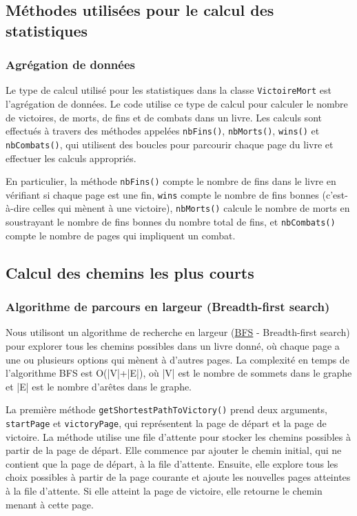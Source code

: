 \documentclass[a4paper,12pt]{article}
\begin{document}
\subsection{Méthodes utilisées pour le calcul des statistiques}
\subsubsection{Agrégation de données}
Le type de calcul utilisé pour les statistiques dans la classe \verb|VictoireMort| est l'agrégation de données.
Le code utilise ce type de calcul pour calculer le nombre de victoires, de morts, de fins et de combats dans un livre. Les calculs sont effectués à travers des méthodes appelées \verb|nbFins()|, \verb|nbMorts()|, \verb|wins()| et \verb|nbCombats()|, qui utilisent des boucles pour parcourir chaque page du livre et effectuer les calculs appropriés.

En particulier, la méthode \verb|nbFins()| compte le nombre de fins dans le livre en vérifiant si chaque page est une fin, \verb|wins| compte le nombre de fins bonnes (c'est-à-dire celles qui mènent à une victoire), \verb|nbMorts()| calcule le nombre de morts en soustrayant le nombre de fins bonnes du nombre total de fins, et \verb|nbCombats()| compte le nombre de pages qui impliquent un combat.
\subsection{Calcul des chemins les plus courts}
\subsubsection{Algorithme de parcours en largeur (Breadth-first search)}
Nous utilisont un algorithme de recherche en largeur (\href{https://en.wikipedia.org/wiki/Breadth-first_search}{BFS} - Breadth-first search) pour explorer tous les chemins possibles dans un livre donné, où chaque page a une ou plusieurs options qui mènent à d'autres pages. La complexité en temps de l'algorithme BFS est O(|V|+|E|), où |V| est le nombre de sommets dans le graphe et |E| est le nombre d'arêtes dans le graphe.

La première méthode \verb|getShortestPathToVictory()| prend deux arguments, \verb|startPage| et \verb|victoryPage|, qui représentent la page de départ et la page de victoire. La méthode utilise une file d'attente pour stocker les chemins possibles à partir de la page de départ. Elle commence par ajouter le chemin initial, qui ne contient que la page de départ, à la file d'attente. Ensuite, elle explore tous les choix possibles à partir de la page courante et ajoute les nouvelles pages atteintes à la file d'attente. Si elle atteint la page de victoire, elle retourne le chemin menant à cette page.
\end{document}
